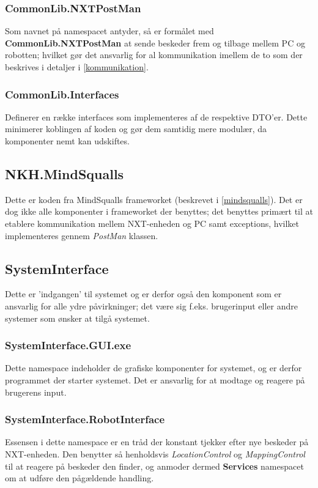 \subsubsection{CommonLib.NXTPostMan}
Som navnet på namespacet antyder, så er formålet med \textbf{CommonLib.NXTPostMan} at sende beskeder frem og tilbage mellem PC og robotten; hvilket gør det ansvarlig for al kommunikation imellem de to som der beskrives i detaljer i \cref{kommunikation}.

\subsubsection{CommonLib.Interfaces}
Definerer en række interfaces som implementeres af de respektive DTO'er.
Dette minimerer koblingen af koden og gør dem samtidig mere modulær, da komponenter nemt kan udskiftes.

\subsection{NKH.MindSqualls}\label{arkitektur:mindsqualls}
Dette er koden fra MindSqualls frameworket (beskrevet i \cref{mindsqualls}).
Det er dog ikke alle komponenter i frameworket der benyttes; det benyttes primært til at etablere kommunikation mellem NXT-enheden og PC samt exceptions, hvilket implementeres gennem \textit{PostMan} klassen.

\subsection{SystemInterface}\label{arkitektur:systeminterface}
Dette er 'indgangen' til systemet og er derfor også den komponent som er ansvarlig for alle ydre påvirkninger; det være sig f.eks. brugerinput eller andre systemer som ønsker at tilgå systemet.

\subsubsection{SystemInterface.GUI.exe}
Dette namespace indeholder de grafiske komponenter for systemet, og er derfor programmet der starter systemet.
Det er ansvarlig for at modtage og reagere på brugerens input.

\subsubsection{SystemInterface.RobotInterface}
Essensen i dette namespace er en tråd der konstant tjekker efter nye beskeder på NXT-enheden.
Den benytter så henholdsvis \textit{LocationControl} og \textit{MappingControl} til at reagere på beskeder den finder, og anmoder dermed \textbf{Services} namespacet om at udføre den pågældende handling.

